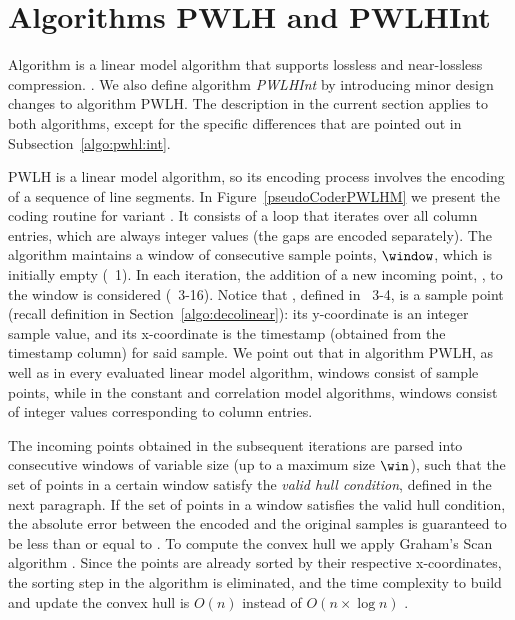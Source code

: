 

\section{Algorithms PWLH and PWLHInt}
\label{algo:pwlh}
\newcommand{\EncodeWindow}{EncodeWindow}


Algorithm \textit{\PWLHfull} \cite{coder:pwlh} is a linear model algorithm that supports lossless and near-lossless compression. \WindowParam {}. We also define algorithm \textit{PWLHInt} by introducing minor design changes to algorithm PWLH. The description in the current section applies to both algorithms, except for the specific differences that are pointed out in Subsection~\ref{algo:pwhl:int}.


PWLH is a linear model algorithm, so its encoding process involves the encoding of a sequence of line segments. In Figure~\ref{pseudoCoderPWLHM} we present the coding routine for variant \maskalgo. It consists of a loop that iterates over all column entries, which are always integer values (the gaps are encoded separately). The algorithm maintains a window of consecutive sample points, $\window$, which is initially empty (\Line~1). In each iteration, the addition of a new incoming point, \incoming, to the window is considered (\Lines~3-16). Notice that \incoming, defined in \Lines~3-4, is a sample point (recall definition in Section~\ref{algo:decolinear}): its y-coordinate is an integer sample value, and its x-coordinate is the timestamp (obtained from the timestamp column) for said sample. We point out that in algorithm PWLH, as well as in every evaluated linear model algorithm, windows consist of sample points, while in the constant and correlation model algorithms, windows consist of integer values corresponding to column entries.


\clearpage





The incoming points obtained in the subsequent iterations are parsed into consecutive windows of variable size (up to a maximum size $\win$), such that the set of points in a certain window satisfy the \textit{valid hull condition}, defined in the next paragraph. If the set of points in a window satisfies the valid hull condition, the absolute error between the encoded and the original samples is guaranteed to be less than or equal to \maxerror. To compute the convex hull we apply Graham's Scan algorithm \cite{GrahamAlgo}. Since the points are already sorted by their respective x-coordinates, the sorting step in the algorithm is eliminated, and the time complexity to build and update the convex hull is $O(n)$ instead of $O(n\times \log n)$ \cite{AnEva2013}.


